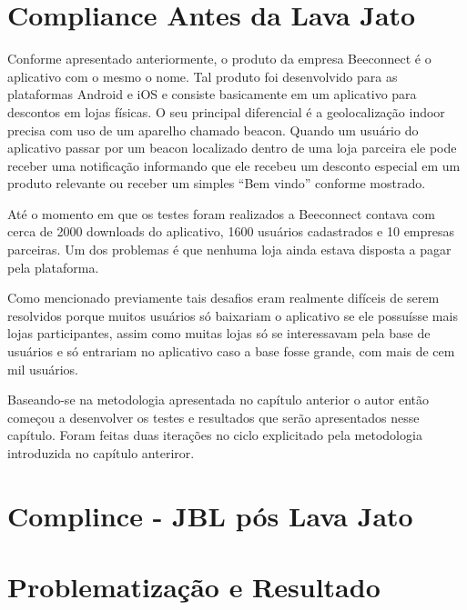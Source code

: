 \chapter{Compliance Antes da Lava Jato}
Conforme apresentado anteriormente, o produto da empresa Beeconnect é o aplicativo com o mesmo o nome. Tal produto foi desenvolvido para as plataformas Android e iOS e consiste basicamente em um aplicativo para descontos em lojas físicas. O seu principal diferencial é a geolocalização indoor precisa com uso de um aparelho chamado beacon. Quando um usuário do aplicativo passar por um beacon localizado dentro de uma loja parceira ele pode receber uma notificação informando que ele recebeu um desconto especial em um produto relevante ou receber um simples \enquote{Bem vindo} conforme mostrado.

Até o momento em que os testes foram realizados a Beeconnect contava com cerca de 2000 downloads do aplicativo, 1600 usuários cadastrados e 10 empresas parceiras. Um dos problemas é que nenhuma loja ainda estava disposta a pagar pela plataforma.

Como mencionado previamente tais desafios eram realmente difíceis de serem resolvidos porque muitos usuários só baixariam o aplicativo se ele possuísse mais lojas participantes, assim como muitas lojas só se interessavam pela base de usuários e só entrariam no aplicativo caso a base fosse grande, com mais de cem mil usuários.

Baseando-se na metodologia apresentada no capítulo anterior o autor então começou a desenvolver os testes e resultados que serão apresentados nesse capítulo. Foram feitas duas iterações no ciclo explicitado pela metodologia introduzida no capítulo anteriror.

\chapter{Complince - JBL pós Lava Jato }



\chapter{Problematização e Resultado}




